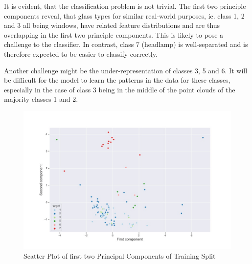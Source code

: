 It is evident, that the classification problem is not trivial. The first two principle components reveal, that glass types for similar real-world purposes, ie. class 1, 2 and 3 all being windows, have related feature distributions and are thus overlapping in the first two principle components. This is likely to pose a challenge to the classifier. In contrast,  class $7$ (headlamp) is well-separated and is therefore expected to be easier to classify correctly.

Another challenge might be the under-representation of classes 3, 5 and 6. It will be difficult for the model to learn the patterns in the data for these classes, especially in the case of class 3 being in the middle of the point clouds of the majority classes 1 and 2.

\begin{figure}[ht]
\centering
\includegraphics[scale=0.35]{figures/pca_best2_scatter.jpg}
\captionsetup{justification=centering,margin=2cm}
\caption{Scatter Plot of first two Principal Components of Training Split}
\label{pca}
\end{figure}
\newpage
